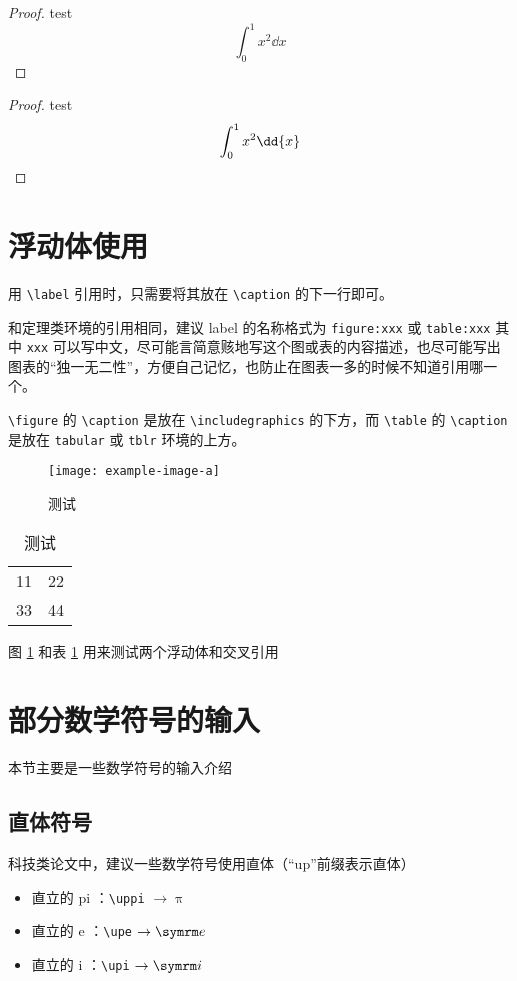 \begin{proof}
  test
  \[
    \int_{0}^{1} x^2 \dd{x}
  \]
\end{proof}

\begin{proof}
  test
  \[
    \int_{0}^{1} x^2 \dd{x}  \qedhere
  \]
\end{proof}

\section{浮动体使用}

用 \verb|\label| 引用时，只需要将其放在 \verb|\caption| 的下一行即可。

和定理类环境的引用相同，建议 label 的名称格式为 \verb|figure:xxx| 或 \verb|table:xxx| 其中 \verb|xxx| 可以写中文，尽可能言简意赅地写这个图或表的内容描述，也尽可能写出图表的“独一无二性”，方便自己记忆，也防止在图表一多的时候不知道引用哪一个。

\verb|\figure| 的 \verb|\caption| 是放在 \verb|\includegraphics| 的下方，而 \verb|\table| 的 \verb|\caption| 是放在 \verb|tabular| 或 \verb|tblr| 环境的上方。

\begin{figure}[htbp]
  \centering
  \texttt{[image: example-image-a]}
  \caption{测试}
  \label{figure:test}
\end{figure}

\begin{table}[htbp]
  \centering
  \caption{测试}
  \label{table:test}
  \begin{tabular}{|c|c|}
    11 & 22 \\
    33 & 44 
  \end{tabular}
\end{table}

图 \ref{figure:test} 和表 \ref{table:test} 用来测试两个浮动体和交叉引用



\section{部分数学符号的输入}

本节主要是一些数学符号的输入介绍


\subsection{直体符号}

科技类论文中，建议一些数学符号使用直体（“up”前缀表示直体）
  \begin{itemize}
    \item 直立的 pi ：\verb|\uppi| $\to \uppi$
    \item 直立的 e ：\verb|\upe| $\to \upe$
    \item 直立的 i ：\verb|\upi| $\to \upi$
  \end{itemize}



